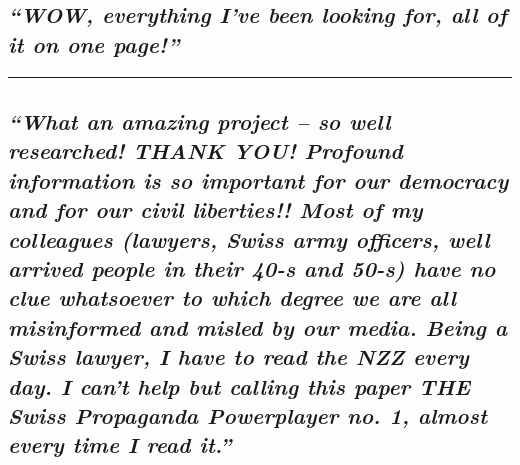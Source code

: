 \hypertarget{wow-everything-ive-been-looking-for-all-of-it-on-one-page}{%
\subsection{\texorpdfstring{\emph{``WOW, everything I've been looking
for, all of it on one
page!''}}{``WOW, everything I've been looking for, all of it on one page!''}}\label{wow-everything-ive-been-looking-for-all-of-it-on-one-page}}

\begin{center}\rule{0.5\linewidth}{\linethickness}\end{center}

\hypertarget{what-an-amazing-project--so-well-researched-thank-you-profound-information-is-so-important-for-our-democracy-and-for-our-civil-liberties-most-of-my-colleagues-lawyers-swiss-army-officers-well-arrived-people-in-their-40-s-and-50-s-have-no-clue-whatsoever-to-which-degree-we-are-all-misinformed-and-misled-by-our-media-being-a-swiss-lawyer-i-have-to-read-the-nzz-every-day-i-cant-help-but-calling-this-paper-the-swiss-propaganda-powerplayer-no-1-almost-every-time-i-read-it}{%
\subsection{\texorpdfstring{\emph{``What an amazing project -- so well
researched! THANK YOU! Profound information is so important for our
democracy and for our civil liberties!! Most of my colleagues (lawyers,
Swiss army officers, well arrived people in their 40-s and 50-s) have no
clue whatsoever to which degree we are all misinformed and misled by our
media. Being a Swiss lawyer, I have to read the NZZ every day. I can't
help but calling this paper THE Swiss Pro­pa­ganda Powerplayer no. 1,
almost every time I read
it.''}}{``What an amazing project -- so well researched! THANK YOU! Profound information is so important for our democracy and for our civil liberties!! Most of my colleagues (lawyers, Swiss army officers, well arrived people in their 40-s and 50-s) have no clue whatsoever to which degree we are all misinformed and misled by our media. Being a Swiss lawyer, I have to read the NZZ every day. I can't help but calling this paper THE Swiss Pro­pa­ganda Powerplayer no. 1, almost every time I read it.''}}\label{what-an-amazing-project--so-well-researched-thank-you-profound-information-is-so-important-for-our-democracy-and-for-our-civil-liberties-most-of-my-colleagues-lawyers-swiss-army-officers-well-arrived-people-in-their-40-s-and-50-s-have-no-clue-whatsoever-to-which-degree-we-are-all-misinformed-and-misled-by-our-media-being-a-swiss-lawyer-i-have-to-read-the-nzz-every-day-i-cant-help-but-calling-this-paper-the-swiss-propaganda-powerplayer-no-1-almost-every-time-i-read-it}}

